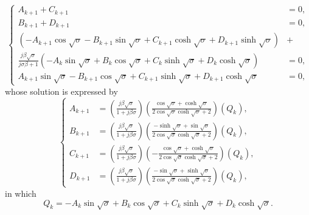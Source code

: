 \documentclass{article}
\begin{document}
\begin{equation}
    \left\{\begin{aligned}
        A_{k+1} + C_{k+1} &= 0, \\
        B_{k+1} + D_{k+1} &= 0, \\
        \left( - A_{k+1} \cos{\sqrt{\sigma}} - B_{k+1} \sin{\sqrt{\sigma}} + C_{k+1} \cosh{\sqrt{\sigma}} + D_{k+1} \sinh{\sqrt{\sigma}} \right) &+ \\
        \frac{j \beta \sqrt{\sigma}}{ j\sigma \beta + 1 } \left( - A_{k} \sin{\sqrt{\sigma}} + B_{k} \cos{\sqrt{\sigma}} + C_{k} \sinh{\sqrt{\sigma}} + D_{k} \cosh{\sqrt{\sigma}} \right) &= 0, \\
        A_{k+1} \sin{\sqrt{\sigma}} - B_{k+1} \cos{\sqrt{\sigma}} + C_{k+1} \sinh{\sqrt{\sigma}} + D_{k+1} \cosh{\sqrt{\sigma}} &= 0,
    \end{aligned}\right.
\end{equation}
whose solution is expressed by
\begin{equation}
    \left\{\begin{aligned}
        A_{k+1} &= \left( \frac{j \beta \sqrt{\sigma }}{1+j \beta \sigma } \right) \left(\frac{\cos\sqrt{\sigma }+\cosh\sqrt{\sigma }}{2 \cos\sqrt{\sigma }\cosh\sqrt{\sigma }+2} \right) \left( Q_k \right), \\
        B_{k+1} &= \left( \frac{j \beta \sqrt{\sigma }}{1+j \beta \sigma } \right) \left( \frac{-\sinh\sqrt{\sigma }+\sin\sqrt{\sigma }}{2 \cos\sqrt{\sigma }\cosh\sqrt{\sigma }+2} \right) \left( Q_k \right), \\
        C_{k+1} &= \left( \frac{j \beta \sqrt{\sigma }}{1+j \beta \sigma } \right) \left( -\frac{\cos\sqrt{\sigma }+\cosh\sqrt{\sigma }}{2 \cos\sqrt{\sigma } \cosh\sqrt{\sigma }+2} \right) \left( Q_k \right), \\
        D_{k+1} &= \left( \frac{j \beta \sqrt{\sigma }}{1+j \beta \sigma } \right) \left( \frac{-\sin\sqrt{\sigma }+\sinh\sqrt{\sigma }}{2 \cos\sqrt{\sigma }\cosh\sqrt{\sigma }+2} \right) \left( Q_k \right), 
    \end{aligned}\right.
\end{equation}
in which
\begin{equation}
    Q_k = - A_{k} \sin{\sqrt{\sigma}} + B_{k} \cos{\sqrt{\sigma}} + C_{k} \sinh{\sqrt{\sigma}} + D_{k} \cosh{\sqrt{\sigma}}.
\end{equation}
\end{document}
